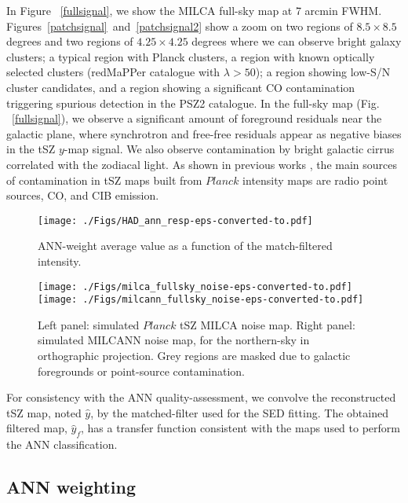 \documentclass[traditabstract,a4,twocolumn]{aa}
\begin{document}
In Figure ~\ref{fullsignal}, we show the MILCA full-sky map at 7 arcmin FWHM.
Figures~\ref{patchsignal}~and~\ref{patchsignal2} show a zoom on two regions of $8.5
  \times 8.5$ degrees and two regions of $4.25
  \times 4.25$ degrees where we can observe bright galaxy clusters; a typical region with Planck clusters, a region with known optically selected clusters (redMaPPer catalogue with $\lambda > 50$); a region showing low-S/N cluster candidates, and a region showing a significant CO contamination triggering spurious detection in the PSZ2 catalogue.
In the full-sky map (Fig. ~\ref{fullsignal}), we observe a significant amount of foreground
residuals near the galactic plane, where synchrotron and free-free
residuals appear as negative biases in the tSZ $y$-map signal. We also
observe contamination by bright galactic cirrus correlated with the
zodiacal light. As shown in previous works \citep{hur13,planckszmap}, the main sources of contamination in tSZ maps built from $Planck$ intensity maps are radio point sources, CO, and CIB
emission.  
\begin{figure}[!th]
\begin{center}
\texttt{[image: ./Figs/HAD\_ann\_resp-eps-converted-to.pdf]}
\caption{ANN-weight average value as a function of the match-filtered intensity.}
\label{aresp}
\end{center}
\end{figure}


\begin{figure*}[!th]
\center
\texttt{[image: ./Figs/milca\_fullsky\_noise-eps-converted-to.pdf]}
\texttt{[image: ./Figs/milcann\_fullsky\_noise-eps-converted-to.pdf]}
\caption{Left panel: simulated $Planck$ tSZ MILCA noise map. Right panel: simulated MILCANN noise map, for the northern-sky in orthographic projection. Grey regions are masked due to galactic foregrounds or point-source contamination.}
\label{fullnoise}
\end{figure*}

For consistency with the ANN quality-assessment, we convolve the reconstructed tSZ map,
noted $\widehat{y}$, by the matched-filter used for the SED fitting. The obtained filtered map, $\widehat{y}_f$, has a transfer function consistent with the maps used to perform the ANN classification.\\

\subsection{ANN weighting}
\end{document}
